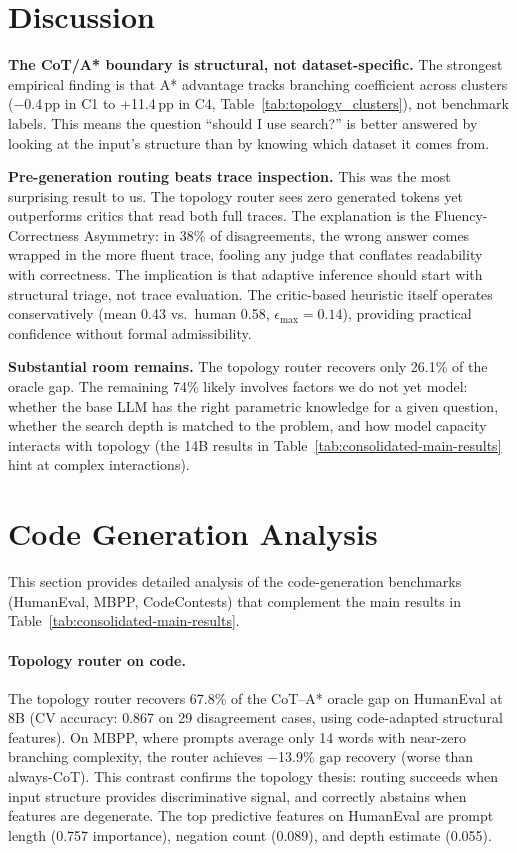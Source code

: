 \documentclass[11pt]{article}
\begin{document}
{\section{Discussion}
\label{sec:discussion}


\textbf{The CoT/A* boundary is structural, not dataset-specific.}
The strongest empirical finding is that A* advantage tracks branching coefficient across clusters ($-$0.4\,pp in C1 to +11.4\,pp in C4, Table~\ref{tab:topology_clusters}), not benchmark labels. This means the question ``should I use search?'' is better answered by looking at the input's structure than by knowing which dataset it comes from.

\textbf{Pre-generation routing beats trace inspection.}
This was the most surprising result to us. The topology router sees zero generated tokens yet outperforms critics that read both full traces. The explanation is the Fluency-Correctness Asymmetry: in 38\% of disagreements, the wrong answer comes wrapped in the more fluent trace, fooling any judge that conflates readability with correctness. The implication is that adaptive inference should start with structural triage, not trace evaluation. The critic-based heuristic itself operates conservatively (mean 0.43 vs.\ human 0.58, $\epsilon_{\max}=0.14$), providing practical confidence without formal admissibility.

\textbf{Substantial room remains.}
The topology router recovers only 26.1\% of the oracle gap. The remaining 74\% likely involves factors we do not yet model: whether the base LLM has the right parametric knowledge for a given question, whether the search depth is matched to the problem, and how model capacity interacts with topology (the 14B results in Table~\ref{tab:consolidated-main-results} hint at complex interactions).






{
\section{Code Generation Analysis}
\label{app:code_generation}

This section provides detailed analysis of the code-generation benchmarks (HumanEval, MBPP, CodeContests) that complement the main results in Table~\ref{tab:consolidated-main-results}.

\paragraph{Topology router on code.}
The topology router recovers 67.8\% of the CoT--A* oracle gap on HumanEval at 8B (CV accuracy: 0.867 on 29 disagreement cases, using code-adapted structural features). On MBPP, where prompts average only 14 words with near-zero branching complexity, the router achieves $-$13.9\% gap recovery (worse than always-CoT). This contrast confirms the topology thesis: routing succeeds when input structure provides discriminative signal, and correctly abstains when features are degenerate. The top predictive features on HumanEval are prompt length (0.757 importance), negation count (0.089), and depth estimate (0.055).

}}
\end{document}
